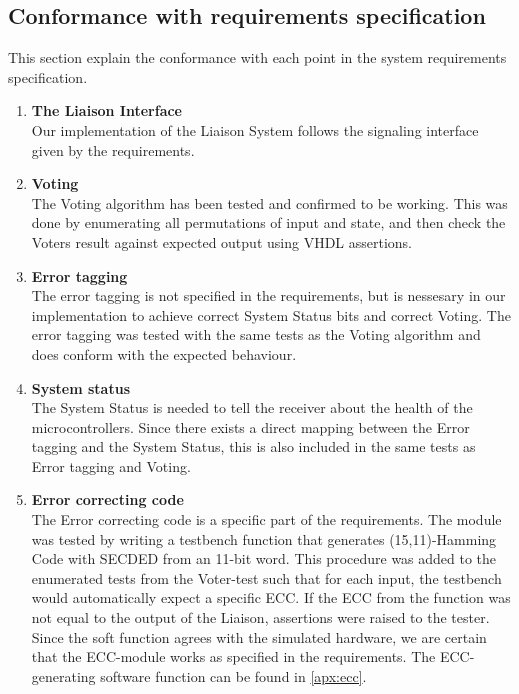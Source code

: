 \subsection{Conformance with requirements specification}
This section explain the conformance with each point in the system requirements specification.
\begin{enumerate}
    \item{\textbf{The Liaison Interface}} \hfill\\
        Our implementation of the Liaison System follows the signaling interface given by the requirements\cite{task}.

    \item{\textbf{Voting}} \hfill\\
        The Voting algorithm has been tested and confirmed to be working. This was done by enumerating all
        permutations of input and state, and then check the Voters result against expected output using
        VHDL assertions.

    \item{\textbf{Error tagging}} \hfill\\
        The error tagging is not specified in the requirements, but is nessesary in our implementation to
        achieve correct System Status bits and correct Voting. The error tagging was tested with the same
        tests as the Voting algorithm and does conform with the expected behaviour.

    \item{\textbf{System status}} \hfill\\
        The System Status is needed to tell the receiver about the health of the microcontrollers. Since
        there exists a direct mapping between the Error tagging and the System Status, this is also
        included in the same tests as Error tagging and Voting.

    \item{\textbf{Error correcting code}} \hfill\\
        The Error correcting code is a specific part of the requirements\cite{task}. The module was tested by writing
        a testbench function that generates (15,11)-Hamming Code with SECDED from an 11-bit word. This
        procedure was added to the enumerated tests from the Voter-test such that for each input, the testbench
        would automatically expect a specific ECC. If the ECC from the function was not equal to the output
        of the Liaison, assertions were raised to the tester. Since the soft function agrees with the simulated
        hardware, we are certain that the ECC-module works as specified in the requirements. The ECC-generating
        software function can be found in \autoref{apx:ecc}.


\end{enumerate}
